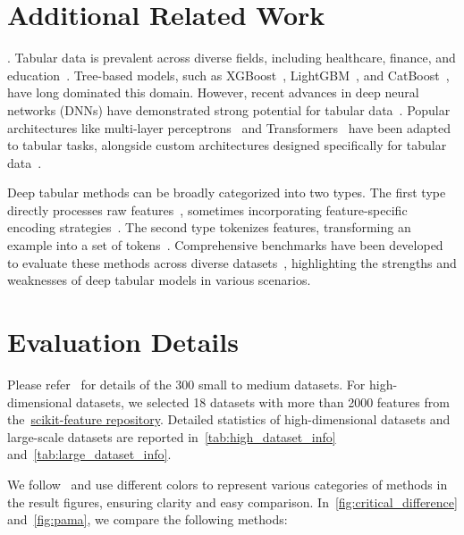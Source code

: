 \section{Additional Related Work}
.
Tabular data is prevalent across diverse fields, including healthcare, finance, and education~\citep{kovalerchuk2005data, hyland2020early, romero2010educational, amatriain2010data}. Tree-based models, such as XGBoost~\citep{chen2016xgboost}, LightGBM~\citep{ke2017lightgbm}, and CatBoost~\citep{Prokhorenkova2018Catboost}, have long dominated this domain. However, recent advances in deep neural networks (DNNs) have demonstrated strong potential for tabular data~\cite{Borisov2024Deep}. Popular architectures like multi-layer perceptrons~\citep{GorishniyRKB21Revisiting, Kadra2021Well} and Transformers~\citep{Huang2020TabTransformer} have been adapted to tabular tasks, alongside custom architectures designed specifically for tabular data~\citep{KlambauerUMH17Self, WangSCJLHC21DCNv2}.

Deep tabular methods can be broadly categorized into two types. The first type directly processes raw features~\cite{David2024RealMLP, gorishniy2023tabr, Ye2024ModernNCA}, sometimes incorporating feature-specific encoding strategies~\cite{Gorishniy2022On}. The second type tokenizes features, transforming an example into a set of tokens~\citep{SongS0DX0T19AutoInt, Huang2020TabTransformer, Rubachev2022revisiting}. Comprehensive benchmarks have been developed to evaluate these methods across diverse datasets~\cite{Grinsztajn2022Why, McElfreshKVCRGW23when, Ye2024Closer, Rubachev2024TabRed}, highlighting the strengths and weaknesses of deep tabular models in various scenarios.

\section{Evaluation Details}
Please refer~\citet{Ye2024Closer} for details of the 300 small to medium datasets. For high-dimensional datasets, we selected 18 datasets with more than 2000 features from the~\href{https://jundongl.github.io/scikit-feature/datasets}{scikit-feature repository}. Detailed statistics of high-dimensional datasets and large-scale datasets are reported in~\autoref{tab:high_dataset_info} and~\autoref{tab:large_dataset_info}. 


We follow~\citet{Ye2024Closer} and use different colors to represent various categories of methods in the result figures, ensuring clarity and easy comparison. In~\autoref{fig:critical_difference} and~\autoref{fig:pama}, we compare the following methods:

